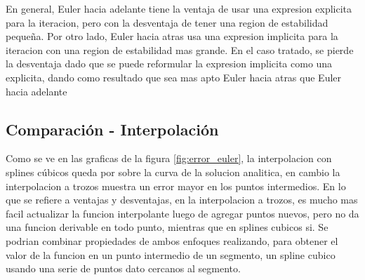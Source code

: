 \documentclass{endm}
\begin{document}
En general, Euler hacia adelante tiene la ventaja de usar una expresion explicita para la iteracion, pero con la desventaja de tener una region de estabilidad pequeña. Por otro lado, Euler hacia atras usa una expresion implicita para la iteracion con una region de estabilidad mas grande. En el caso tratado, se pierde la desventaja dado que se puede reformular la expresion implicita como una explicita, dando como resultado que sea mas apto Euler hacia atras que Euler hacia adelante

\subsection{Comparación - Interpolación}
Como se ve en las graficas de la figura \ref{fig:error_euler}, la interpolacion con splines cúbicos queda por sobre la curva de la solucion analitica, en cambio la interpolacion a trozos muestra un error mayor en los puntos intermedios.
En lo que se refiere a ventajas y desventajas, en la interpolacion a trozos, es mucho mas facil actualizar la funcion interpolante luego de agregar puntos nuevos, pero no da una funcion derivable en todo punto, mientras que en splines cubicos si. Se podrian combinar propiedades de ambos enfoques realizando, para obtener el valor de la funcion en un punto intermedio de un segmento, un spline cubico usando una serie de puntos dato cercanos al segmento.

\clearpage
\printbibliography
\end{document}
